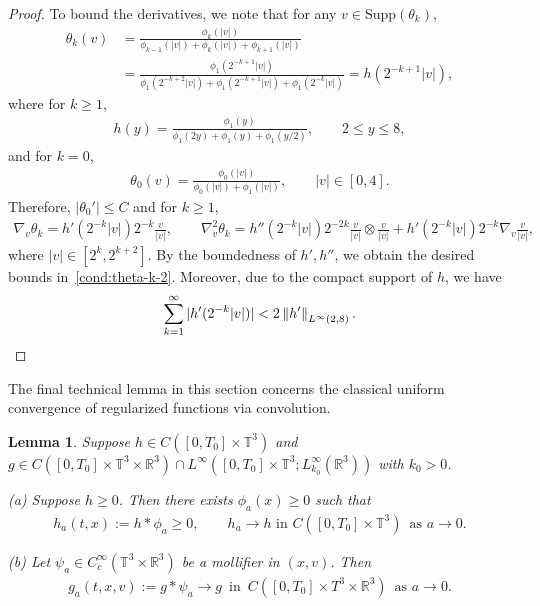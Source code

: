 \documentclass[11pt,american, reqno]{amsart}
\numberwithin{equation}{section}
\newtheorem{lemma}[theorem]{Lemma}
\newcommand{\R}{\mathbb R}
\newcommand{\1}{\mathds{1}}
\newcommand{\Ni}{\noindent}
\newcommand{\norm}[1]{\left\lVert#1\right\rVert}
\newcommand{\T}{\mathbb{T}}
\numberwithin{equation}{section}
\begin{document}
\begin{proof}
To bound the derivatives, we note that for any $v \in \text{Supp}(\theta_k)$,
\begin{align*}
 \theta_k (v)
&= \frac{\phi_k(|v|)}{\phi_{k-1}(|v|) + \phi_k(|v|) + \phi_{k+1}(|v|)}
\\
& = \frac{\phi_1(2^{-k+1}|v|)}{\phi_1(2^{-k+2}|v|) + \phi_1(2^{-k+1}|v|) + \phi_1(2^{-k}|v|)}
= h(2^{-k+1} |v|),
\end{align*}
where for $k \geq 1$,
\begin{align*}
 h(y) = \frac{\phi_1(y)}{\phi_1(2y) + \phi_1(y) + \phi_1(y/2)},
\qquad
  2 \leq y \leq 8,
\end{align*}
and for $k=0$, 
\begin{align*}
 \theta_0(v) = \frac{\phi_0(|v|)}{\phi_0(|v|) + \phi_1 (|v|)}, 
\qquad |v| \in [0, 4].
\end{align*}
Therefore, $|\theta_0'| \leq C$ and for $k \geq 1$,
\begin{align*}
 \nabla_v \theta_k
= h'(2^{-k} |v|) 2^{-k} \frac{v}{|v|},  
\qquad  
 \nabla_v^2 \theta_k
= h''(2^{-k} |v|) 2^{-2k}
  \frac{v}{|v|} \otimes 
  \frac{v}{|v|}
  + h'(2^{-k} |v|) 2^{-k}
    \nabla_v \frac{v}{|v|},
\end{align*}
where $|v| \in [2^{k},  2^{k+2}]$. 
By the boundedness of $h', h''$, we obtain the desired bounds in~\eqref{cond:theta-k-2}. Moreover, due to the compact support of $h$, we have
\begin{equation*}
 \sum_{k=1}^\infty |h'(2^{-k} |v|)| < 2 \norm{h'}_{L^\infty(2,8)}. 
\qedhere
\end{equation*}
\end{proof}

The final technical lemma in this section concerns the classical uniform convergence of regularized functions via convolution. 

\begin{lemma} \label{lem:kernels}
Suppose $h \in C([0, T_0] \times \T^3)$ and $g \in C([0, T_0] \times \T^3 \times \R^3) \cap L^\infty([0, T_0] \times \T^3; L^\infty_{k_0}(\R^3))$ with $k_0 > 0$. 

\Ni (a) Suppose $h \geq 0$. Then there exists $\phi_a(x) \geq 0$ such that 
\begin{align*}
 h_a(t, x) := h * \phi_a \geq 0, 
\qquad
 h_a \to h \,\, \text{in} \,\,
C([0, T_0] \times \T^3)
\,\,\,
\text{as $a \to 0$}.
\end{align*}

\Ni (b) Let $\psi_a \in C^\infty_c(\T^3 \times \R^3)$ be a mollifier in $(x, v)$. Then 
\begin{align*}
 g_a (t, x, v)
:= g \ast \psi_a 
\to g \,\,\,
\text{in} \,\,\,
C([0, T_0] \times T^3 \times \R^3) \,\,\,
\text{as $a \to 0$.}
\end{align*}
\end{lemma}
\end{document}
